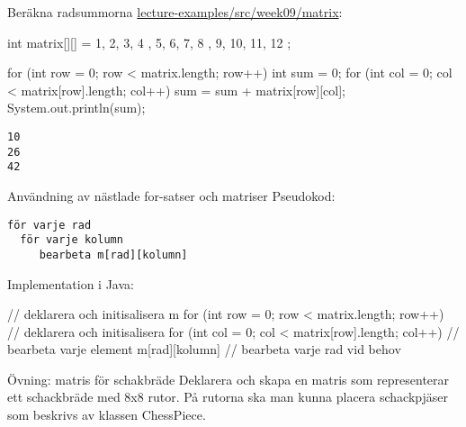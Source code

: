 \documentclass{lecturenotes}
\begin{document}
\begin{Slide}{Beräkna radsummorna}
\footnotesize\href{https://github.com/bjornregnell/lth-eda016-2015/tree/master/lectures/examples/eclipse-ws/lecture-examples/src/week09}{lecture-examples/src/week09/matrix}:
\begin{Code}[numberstyle=,numbers=left]
        int matrix[][] = { { 1, 2, 3, 4 }, { 5, 6, 7, 8 }, {9, 10, 11, 12} };
        
        for (int row = 0; row < matrix.length; row++) {
            int sum = 0;
            for (int col = 0; col < matrix[row].length; col++) {
                sum = sum + matrix[row][col];
            }
            System.out.println(sum);
        }
\end{Code}
\begin{verbatim}
10
26
42
\end{verbatim}
\end{Slide}

\begin{Slide}{Användning av nästlade for-satser och matriser}
Pseudokod:
\begin{verbatim}
för varje rad
  för varje kolumn
     bearbeta m[rad][kolumn]
\end{verbatim}
Implementation i Java:
\begin{Code}
        // deklarera och initisalisera m
        for (int row = 0; row < matrix.length; row++) {
            // deklarera och initisalisera
            for (int col = 0; col < matrix[row].length; col++) {
                 // bearbeta varje element m[rad][kolumn]
            }
           // bearbeta varje rad vid behov
        }
\end{Code}
\end{Slide}

\begin{Slide}{Övning: matris för schakbräde}
Deklarera och skapa en matris som representerar ett schackbräde med 8x8 rutor. På rutorna ska man kunna placera schackpjäser som beskrivs av klassen ChessPiece.
\end{Slide}
\end{document}
